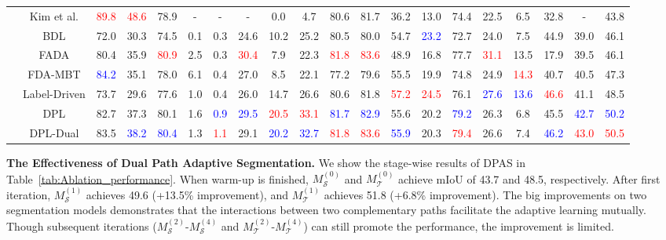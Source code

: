 \documentclass[10pt,twocolumn,letterpaper]{article}
\begin{document}
\begin{table*}[t!p]
\begin{tabular}{cccccccccccccccccccc}
&Kim et al. \cite{kim2020learning}  & \textcolor{red}{89.8}& \textcolor{red}{48.6}& 78.9&-&-&-&0.0& 4.7& 80.6& 81.7& 36.2& 13.0& 74.4& 22.5& 6.5& 32.8&-& 43.8  \\
&BDL \cite{li2019bidirectional}         & 72.0& 30.3& 74.5& 0.1& 0.3& 24.6& 10.2& 25.2& 80.5& 80.0& 54.7& \textcolor{blue}{23.2}& 72.7& 24.0& 7.5& 44.9& 39.0& 46.1 \\
&FADA \cite{wang2020classes}         & 80.4& 35.9& \textcolor{red}{80.9}& 2.5& 0.3& \textcolor{red}{30.4}& 7.9& 22.3& \textcolor{red}{81.8}& \textcolor{red}{83.6}& 48.9& 16.8& 77.7& \textcolor{red}{31.1}& 13.5& 17.9& 39.5& 46.1  \\
&FDA-MBT \cite{yang2020fda}  & \textcolor{blue}{84.2}& 35.1& 78.0& 6.1& 0.4& 27.0& 8.5& 22.1& 77.2& 79.6& 55.5& 19.9& 74.8& 24.9& \textcolor{red}{14.3}& 40.7& 40.5& 47.3  \\
&Label-Driven \cite{yang2020label}& 73.7& 29.6& 77.6& 1.0& 0.4& 26.0& 14.7& 26.6& 80.6& 81.8& \textcolor{red}{57.2}& \textcolor{red}{24.5}& 76.1& \textcolor{blue}{27.6}& \textcolor{blue}{13.6}& \textcolor{red}{46.6}& 41.1& 48.5  \\ 
\cline{2-20}
&DPL& 
82.7& 37.3& 80.1& 1.6& \textcolor{blue}{0.9}& \textcolor{blue}{29.5}& \textcolor{red}{20.5}& \textcolor{red}{33.1}& \textcolor{blue}{81.7}& \textcolor{blue}{82.9}& 55.6& 20.2& \textcolor{blue}{79.2}& 26.3& 6.8& 45.5& \textcolor{blue}{42.7}& \textcolor{blue}{50.2}
\\
&DPL-Dual &83.5& \textcolor{blue}{38.2}& \textcolor{blue}{80.4}& 1.3& \textcolor{red}{1.1}& 29.1& \textcolor{blue}{20.2}& \textcolor{blue}{32.7}& \textcolor{red}{81.8}& \textcolor{red}{83.6}& \textcolor{blue}{55.9}& 20.3& \textcolor{red}{79.4}& 26.6& 7.4& \textcolor{blue}{46.2}& \textcolor{red}{43.0}& \textcolor{red}{50.5}


\\
\bottomrule

\end{tabular}
\vspace{-1em}
\end{table*}

{\noindent \textbf{The Effectiveness of Dual Path Adaptive Segmentation.}}\hspace{3pt}
We show the stage-wise results of DPAS in Table~\ref{tab:Ablation_performance}. When warm-up is finished, $M_\mathcal{S}^{(0)}$ and $M_\mathcal{T}^{(0)}$ achieve mIoU of 43.7 and 48.5, respectively. After first iteration, $M_\mathcal{S}^{(1)}$ achieves 49.6 (+13.5{\%} improvement), and $M_\mathcal{T}^{(1)}$ achieves 51.8 (+6.8{\%} improvement). The big improvements on two segmentation models demonstrates that the interactions between two complementary paths facilitate the adaptive learning mutually. Though subsequent iterations ($M_\mathcal{S}^{(2)}$-$M_\mathcal{S}^{(4)}$ and $M_\mathcal{T}^{(2)}$-$M_\mathcal{T}^{(4)}$) can still promote the performance, the improvement is limited.
\end{document}
